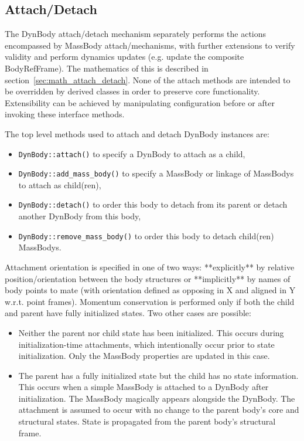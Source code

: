 \subsection{Attach/Detach}\label{sec:detailed_attach_detach}
The DynBody attach/detach mechanism separately performs the actions encompassed 
by MassBody attach/mechanisms, with further extensions to verify validity and 
perform dynamics updates (e.g. update the composite BodyRefFrame). The mathematics
of this is described in section~\ref{sec:math_attach_detach}. None of the 
attach methods are intended to be overridden by derived classes in order to 
preserve core functionality. Extensibility can be achieved by manipulating 
configuration before or after invoking these interface methods.

The top level methods used to attach and detach DynBody instances are: \begin{itemize}
\item \verb+DynBody::attach()+ to specify a DynBody to attach as a child, 
\item \verb+DynBody::add_mass_body()+ to specify a MassBody or linkage of 
    MassBodys to attach as child(ren), 
\item \verb+DynBody::detach()+ to order this body to detach from its parent 
    or detach another DynBody from this body,
\item \verb+DynBody::remove_mass_body()+ to order this body to detach child(ren) 
    MassBodys. 
\end{itemize}

Attachment orientation is specified in one of two ways: **explicitly** by 
relative position/orientation between the body structures or **implicitly** by 
names of body points to mate (with orientation defined as opposing in X and 
aligned in Y w.r.t. point frames). 
Momentum conservation is performed only if both the child and parent
have fully initialized states. Two other cases are possible:
\begin{itemize}
\item Neither the parent nor child state has been initialized. This occurs
during initialization-time attachments, which intentionally occur prior
to state initialization. Only the MassBody properties are updated in this case.
\item The parent has a fully initialized state but the child has no state
information. This occurs when a simple MassBody is attached to a DynBody
after initialization. The MassBody magically appears alongside the
DynBody. The attachment is assumed to occur with no change to the parent
body's core and structural states. State is propagated from the parent
body's structural frame.
\end{itemize}

